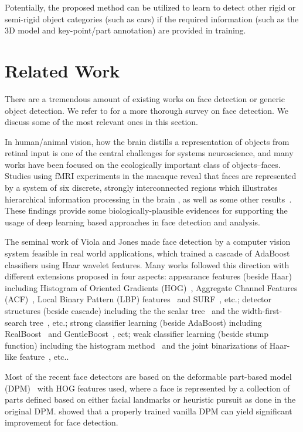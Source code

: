 \documentclass[runningheads]{llncs}
\begin{document}
Potentially, the proposed method can be utilized to learn to detect other rigid or semi-rigid object categories (such as cars) if the required information (such as the 3D model and key-point/part annotation) are provided in training.




\section{Related Work}

There are a tremendous amount of existing works on face detection or generic object detection. We refer to \cite{FaceDetSurvey} for a more thorough survey on face detection. We discuss some of the most relevant ones in this section.

In human/animal vision, how  the brain distills a representation of objects from retinal input is one of the central challenges for systems neuroscience, and many works have been focused on  the ecologically important class of objects--faces.   Studies using fMRI experiments in the macaque reveal that faces are represented by a system of six discrete, strongly interconnected regions which illustrates hierarchical information processing in the brain \cite{Face6Area}, as well as some other results~\cite{Face19Results}. These findings provide some biologically-plausible evidences for supporting the usage of deep learning based approaches in face detection and analysis.

The seminal work of Viola and Jones \cite{VJ} made face detection by a computer vision system feasible in real world applications, which trained a cascade of AdaBoost classifiers using Haar wavelet features. Many works followed this direction with different extensions proposed in four aspects: appearance features (beside Haar) including Histogram of Oriented Gradients (HOG)~\cite{HOG},  Aggregate Channel Features (ACF)~\cite{ACF}, Local Binary Pattern (LBP) features~\cite{LBP} and SURF~\cite{SURF}, etc.; detector structures (beside cascade) including the the scalar tree~\cite{ScalarTree} and the width-first-search tree~\cite{MVFD}, etc.; strong classifier learning (beside AdaBoost) including RealBoost~\cite{RealBoost} and GentleBoost~\cite{GentleBoost}, ect; weak classifier learning (beside stump function) including the histogram method~\cite{KLBoost} and the joint binarizations of Haar-like feature~\cite{JointBinHaar}, etc..

Most of the recent face detectors are based on the deformable part-based  model (DPM)~\cite{DPM,AFW,DPMFace} with HOG features used, where a face is represented by a collection of parts defined based on either facial landmarks or heuristic pursuit as done in the original DPM. \cite{DPMFace} showed that a properly trained vanilla DPM can yield significant improvement for face detection.
\end{document}
